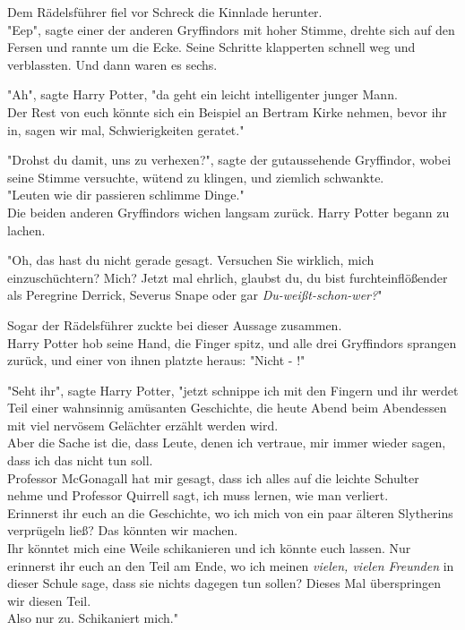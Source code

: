 {Dem Rädelsführer fiel vor Schreck die Kinnlade herunter.\\ "Eep", sagte einer der anderen Gryffindors mit hoher Stimme, drehte sich auf den Fersen und rannte um die Ecke. Seine Schritte klapperten schnell weg und verblassten. Und dann waren es sechs.

"Ah", sagte Harry Potter, "da geht ein leicht intelligenter junger Mann.\\ Der Rest von euch könnte sich ein Beispiel an Bertram Kirke nehmen, bevor ihr in, sagen wir mal, Schwierigkeiten geratet."

"Drohst du damit, uns zu verhexen?", sagte der gutaussehende Gryffindor, wobei seine Stimme versuchte, wütend zu klingen, und ziemlich schwankte.\\ "Leuten wie dir passieren schlimme Dinge."\\ Die beiden anderen Gryffindors wichen langsam zurück. Harry Potter begann zu lachen.

"Oh, das hast du nicht gerade gesagt. Versuchen Sie wirklich, mich einzuschüchtern? Mich? Jetzt mal ehrlich, glaubst du, du bist furchteinflößender als Peregrine Derrick, Severus Snape oder gar \emph{Du-weißt-schon-wer?}"

Sogar der Rädelsführer zuckte bei dieser Aussage zusammen.\\ Harry Potter hob seine Hand, die Finger spitz, und alle drei Gryffindors sprangen zurück, und einer von ihnen platzte heraus: "Nicht - !"

"Seht ihr", sagte Harry Potter, "jetzt schnippe ich mit den Fingern und ihr werdet Teil einer wahnsinnig amüsanten Geschichte, die heute Abend beim Abendessen mit viel nervösem Gelächter erzählt werden wird.\\ Aber die Sache ist die, dass Leute, denen ich vertraue, mir immer wieder sagen, dass ich das nicht tun soll.\\ Professor McGonagall hat mir gesagt, dass ich alles auf die leichte Schulter nehme und Professor Quirrell sagt, ich muss lernen, wie man verliert.\\ Erinnerst ihr euch an die Geschichte, wo ich mich von ein paar älteren Slytherins verprügeln ließ? Das könnten wir machen.\\ Ihr könntet mich eine Weile schikanieren und ich könnte euch lassen. Nur erinnerst ihr euch an den Teil am Ende, wo ich meinen \emph{vielen, vielen Freunden} in dieser Schule sage, dass sie nichts dagegen tun sollen? Dieses Mal überspringen wir diesen Teil.\\ Also nur zu. Schikaniert mich."

}
